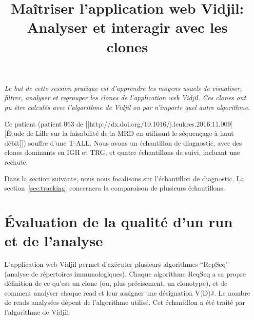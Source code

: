 \documentclass[10pt]{article}
\title{Maîtriser l'application web Vidjil:\\ Analyser et interagir avec les
clones}
\begin{document}
\maketitle

\textit{Le but de cette session pratique est d'apprendre les moyens usuels de
  visualiser, filtrer, analyser et regrouper les clones de l'application web
  Vidjil.
%
Ces clones ont pu être calculés avec l'algorithme de Vidjil ou par n'importe
quel autre algorithme.}

\bigskip


Ce patient (patient 063 de [[http://dx.doi.org/10.1016/j.leukres.2016.11.009][Étude de Lille sur la faisabilité de la MRD en utilisant le séquençage à haut débit]])
souffre d'une T-ALL. Nous avons un échantillon de diagnostic,
avec des clones dominants en IGH et TRG,
et quatre échantillons de suivi, incluant une rechute.


Dans la section suivante, nous nous focalisons sur l'échantillon de diagnostic.
La section~\ref{sec:tracking} concernera la comparaison de plusieurs échantillons.



\section{Évaluation de la qualité d'un run et de l'analyse}
L'application web Vidjil permet d'exécuter plusieurs algorithmes ``RepSeq'' (analyse de répertoires immunologiques).
Chaque algorithme ReqSeq a sa propre définition de ce qu'est un clone
(ou, plus précisement, un clonotype),
et de comment analyser chaque read et leur assigner une désignation V(D)J.
Le nombre de reads analysées dépent de l'algorithme utilisé.
Cet échantillon a été traité par l'algorithme de Vidjil.


\end{document}
